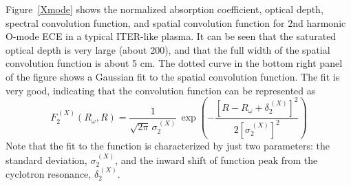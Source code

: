 \documentclass[12pt,prb,aps]{revtex4-1}
\begin{document}
Figure~\ref{Xmode} shows the normalized absorption coefficient, optical depth, spectral convolution function, and spatial convolution function for
2nd harmonic O-mode ECE in a typical ITER-like plasma. It can be seen that the saturated optical depth is very  large (about 200), and that the full 
width of the spatial convolution function is about 5 cm. The dotted curve in the bottom right panel of the figure shows a Gaussian fit to the spatial 
convolution function. The fit is very good, indicating that the convolution function 
can be represented as
\begin{equation}
F_2^{\,(X)}(R_\omega,R)= \frac{1}{\sqrt{2\pi}\,\sigma_2^{\,(X)}}\,
\exp\left(-\frac{\left[R-R_\omega+\delta_2^{\,(X)}\right]^2}{2\left[\sigma_2^{\,(X)}\right]^2}\right)
\end{equation}
Note that the fit to the function is characterized by just two parameters: the standard deviation, $\sigma_2^{\,(X)}$, and the inward shift
of function peak from the cyclotron resonance, $\delta_2^{\,(X)}$. 
\end{document}
